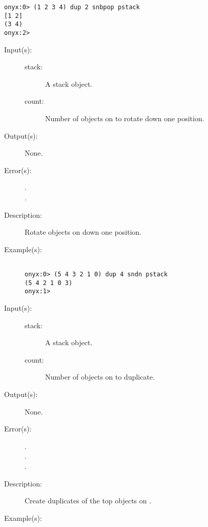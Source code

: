 \begin{description}
\begin{description}
\begin{verbatim}
onyx:0> (1 2 3 4) dup 2 snbpop pstack
[1 2]
(3 4)
onyx:2>
		\end{verbatim}
	\end{description}
\label{systemdict:sndn}
\item[{\onyxop{stack count}{sndn}{--}}: ]
	\begin{description}\item[]
	\item[Input(s): ]
		\begin{description}\item[]
		\item[stack: ]
			A stack object.
		\item[count: ]
			Number of objects on  to rotate down one
			position.
		\end{description}
	\item[Output(s): ] None.
	\item[Error(s): ]
		\begin{description}\item[]
		\item[.]
		\item[.]
		\end{description}
	\item[Description: ]
		Rotate  objects on  down one position.
	\item[Example(s): ]\begin{verbatim}

onyx:0> (5 4 3 2 1 0) dup 4 sndn pstack
(5 4 2 1 0 3)
onyx:1>
		\end{verbatim}
	\end{description}
\label{systemdict:sndup}
\item[{\onyxop{stack count}{sndup}{--}}: ]
	\begin{description}\item[]
	\item[Input(s): ]
		\begin{description}\item[]
		\item[stack: ]
			A stack object.
		\item[count: ]
			Number of objects on  to duplicate.
		\end{description}
	\item[Output(s): ] None.
	\item[Error(s): ]
		\begin{description}\item[]
		\item[.]
		\item[.]
		\item[.]
		\end{description}
	\item[Description: ]
		Create duplicates of the top  objects on
		.
	\item[Example(s): ]\begin{verbatim}


\end{verbatim}
\end{description}
\end{description}
